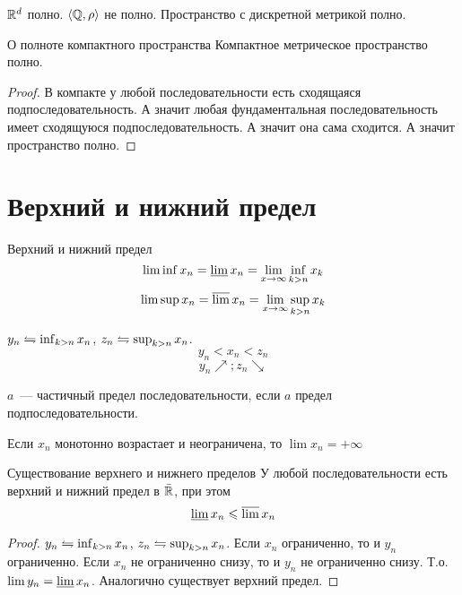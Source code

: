 \begin{Rem}
$\mathbb{R}^d$ полно. $\left<\mathbb{Q}, \rho\right>$ не полно. Пространство с дискретной метрикой полно.
\end{Rem}

\begin{theorem}{О полноте компактного пространства}
Компактное метрическое пространство полно.
\end{theorem}
\begin{proof}
В компакте у любой последовательности есть сходящаяся подпоследовательность. А значит любая фундаментальная последовательность имеет сходящуюся подпоследовательность.
А значит она сама сходится. А значит пространство полно.
\end{proof}

\section{Верхний и нижний предел}

\begin{Def}
Верхний и нижний предел
$$\liminf x_n = \varliminf x_n = \lim_{x\rightarrow\infty}\inf_{k>n} x_k$$
$$\limsup x_n = \varlimsup x_n = \lim_{x\rightarrow\infty}\sup_{k>n} x_k$$
\end{Def}
\begin{Rem}
$y_n \leftrightharpoons \inf_{k>n} x_n$, $z_n \leftrightharpoons \sup_{k>n} x_n$.
$$y_n<x_n<z_n$$
$$y_n \nearrow{}; z_n \searrow$$
\end{Rem}

\begin{Def}
$a$~--- частичный предел последовательности, если $a$ предел подпоследовательности.
\end{Def}

\begin{lemma}
Если $x_n$ монотонно возрастает и неограничена, то $\lim x_n = +\infty$
\end{lemma}

\begin{theorem}{Существование верхнего и нижнего пределов}
У любой последовательности есть верхний и нижний предел в $\bar{\mathbb{R}}$, при этом
$$\varliminf x_n \leqslant \varlimsup x_n$$
\end{theorem}
\begin{proof}
$y_n \leftrightharpoons \inf_{k>n} x_n$, $z_n \leftrightharpoons \sup_{k>n} x_n$.
Если $x_n$ ограниченно, то и $y_n$ ограниченно. Если $x_n$ не ограниченно снизу, то и $y_n$ не ограниченно снизу. Т.о. $\lim y_n = \varliminf x_n$. Аналогично 
существует верхний предел.
\end{proof}

